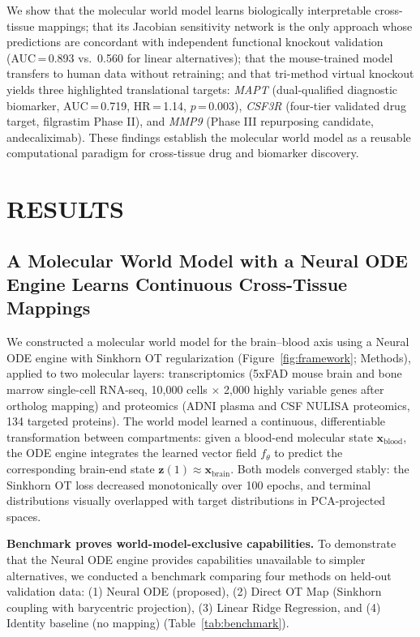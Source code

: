 \documentclass[12pt,a4paper]{article}
\begin{document}
We show that the molecular world model learns biologically interpretable cross-tissue mappings; that its Jacobian sensitivity network is the only approach whose predictions are concordant with independent functional knockout validation (AUC\,=\,0.893 vs.\ 0.560 for linear alternatives); that the mouse-trained model transfers to human data without retraining; and that tri-method virtual knockout yields three highlighted translational targets: \textit{MAPT} (dual-qualified diagnostic biomarker, AUC\,=\,0.719, HR\,=\,1.14, $p$\,=\,0.003), \textit{CSF3R} (four-tier validated drug target, filgrastim Phase II), and \textit{MMP9} (Phase III repurposing candidate, andecaliximab). These findings establish the molecular world model as a reusable computational paradigm for cross-tissue drug and biomarker discovery.

\section{RESULTS}

\subsection{A Molecular World Model with a Neural ODE Engine Learns Continuous Cross-Tissue Mappings}

We constructed a molecular world model for the brain--blood axis using a Neural ODE engine with Sinkhorn OT regularization (Figure~\ref{fig:framework}; Methods), applied to two molecular layers: transcriptomics (5xFAD mouse brain and bone marrow single-cell RNA-seq, 10{,}000 cells $\times$ 2{,}000 highly variable genes after ortholog mapping) and proteomics (ADNI plasma and CSF NULISA proteomics, 134 targeted proteins). The world model learned a continuous, differentiable transformation between compartments: given a blood-end molecular state $\mathbf{x}_{\text{blood}}$, the ODE engine integrates the learned vector field $f_\theta$ to predict the corresponding brain-end state $\mathbf{z}(1) \approx \mathbf{x}_{\text{brain}}$. Both models converged stably: the Sinkhorn OT loss decreased monotonically over 100 epochs, and terminal distributions visually overlapped with target distributions in PCA-projected spaces.

\textbf{Benchmark proves world-model-exclusive capabilities.}
To demonstrate that the Neural ODE engine provides capabilities unavailable to simpler alternatives, we conducted a benchmark comparing four methods on held-out validation data: (1) Neural ODE (proposed), (2) Direct OT Map (Sinkhorn coupling with barycentric projection), (3) Linear Ridge Regression, and (4) Identity baseline (no mapping) (Table~\ref{tab:benchmark}).
\end{document}
